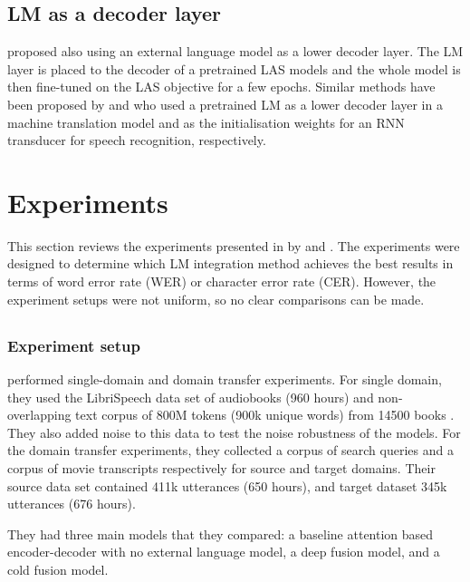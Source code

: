 \documentclass[11pt]{article}
\begin{document}
\subsection{LM as a decoder layer}
\citet{toshniwal2018comparison} proposed also using an external language model as a lower decoder layer. The LM layer is placed to the decoder of a pretrained LAS models and the whole model is then fine-tuned on the LAS objective for a few epochs. Similar methods have been proposed by \citet{Ramachandran2017} and \citet{Rao2018} who used a pretrained LM as a lower decoder layer in a machine translation model and as the initialisation weights for an RNN transducer for speech recognition, respectively.





\section{Experiments}

This section reviews the experiments presented in by \citet{sriram2017cold} and \citet{toshniwal2018comparison}. The experiments were designed to determine which LM integration method achieves the best results in terms of word error rate (WER) or character error rate (CER). However, the experiment setups were not uniform, so no clear comparisons can be made.

\subsection{\citet{sriram2017cold}}
\subsubsection{Experiment setup}
\citet{sriram2017cold} performed single-domain and domain transfer experiments. For single domain, they used the LibriSpeech data set of audiobooks (960 hours) and non-overlapping text corpus of 800M tokens (900k unique words) from 14500 books \citep{panayotov2015librispeech}. They also added noise to this data to test the noise robustness of the models. For the domain transfer experiments, they collected a corpus of search queries and a corpus of movie transcripts respectively for source and target domains. Their source data set contained 411k utterances (650 hours), and target dataset 345k utterances (676 hours).

They had three main models that they compared: a baseline attention based encoder-decoder with no external language model, a deep fusion model, and a cold fusion model.
\end{document}
